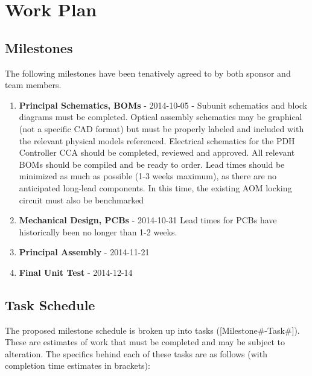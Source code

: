 \newpage
\section{Work Plan}

\subsection{Milestones} %

The following milestones have been tenatively agreed to by both sponsor and
team members.

\begin{enumerate}
  \item{\textbf{Principal Schematics, BOMs} - 2014-10-05} - Subunit schematics
  and block diagrams must be completed. Optical assembly schematics may be
  graphical (not a specific CAD format) but must be properly labeled and
  included with the relevant physical models referenced. Electrical schematics
  for the PDH Controller CCA should be completed, reviewed and approved. All
  relevant BOMs should be compiled and be ready to order. Lead times should be
  minimized as much as possible (1-3 weeks maximum), as there are no
  anticipated long-lead components. In this time, the existing AOM locking
  circuit must also be benchmarked
  \item{\textbf{Mechanical Design, PCBs} - 2014-10-31} Lead times for PCBs have
  historically been no longer than 1-2 weeks.
  \item{\textbf{Principal Assembly} - 2014-11-21}
  \item{\textbf{Final Unit Test} - 2014-12-14}
\end{enumerate}

\subsection{Task Schedule}  %

The proposed milestone schedule is broken up into tasks ([Milestone\#-Task\#]).
These are estimates of work that must be completed and may be subject to
alteration. The specifics behind each of these tasks are as follows (with
completion time estimates in brackets):

